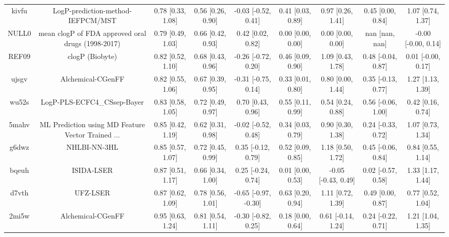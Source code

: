 \documentclass{article}
\begin{document}
\begin{center}
\begin{longtable}{|ccccccccc|}
 kivfu &                  LogP-prediction-method-IEFPCM/MST &  0.78 [0.33, 1.08] &  0.56 [0.26, 0.90] &   -0.03 [-0.52, 0.41] &  0.41 [0.03, 0.89] &    0.97 [0.26, 1.41] &    0.45 [0.00, 0.84] &     1.07 [0.74, 1.37] \\
 NULL0 &  mean clogP of FDA approved oral drugs (1998-2017) &  0.79 [0.49, 1.03] &  0.66 [0.42, 0.93] &     0.42 [0.02, 0.82] &  0.00 [0.00, 0.00] &    0.00 [0.00, 0.00] &       nan [nan, nan] &   -0.00 [-0.00, 0.14] \\
 REF09 &                                    clogP (Biobyte) &  0.82 [0.52, 1.10] &  0.68 [0.43, 0.96] &   -0.26 [-0.72, 0.20] &  0.46 [0.09, 0.90] &    1.09 [0.43, 1.78] &   0.48 [-0.04, 0.87] &    0.01 [-0.00, 0.17] \\
 ujsgv &                                  Alchemical-CGenFF &  0.82 [0.55, 1.06] &  0.67 [0.39, 0.95] &   -0.31 [-0.75, 0.14] &  0.33 [0.01, 0.80] &    0.80 [0.00, 1.44] &   0.35 [-0.13, 0.77] &     1.27 [1.13, 1.39] \\
 wu52s &                        LogP-PLS-ECFC4\_CSsep-Bayer &  0.83 [0.58, 1.05] &  0.72 [0.49, 0.97] &     0.70 [0.43, 0.96] &  0.55 [0.11, 0.99] &    0.54 [0.24, 0.88] &   0.56 [-0.06, 1.00] &     0.42 [0.16, 0.74] \\
 5mahv &  ML Prediction using MD Feature Vector Trained ... &  0.85 [0.42, 1.19] &  0.62 [0.31, 0.98] &   -0.02 [-0.52, 0.48] &  0.34 [0.03, 0.79] &    0.90 [0.30, 1.38] &   0.24 [-0.33, 0.72] &     1.07 [0.73, 1.34] \\
 g6dwz &                                       NHLBI-NN-3HL &  0.85 [0.57, 1.07] &  0.72 [0.45, 0.99] &    0.35 [-0.12, 0.79] &  0.52 [0.09, 0.85] &    1.18 [0.50, 1.72] &   0.45 [-0.06, 0.84] &     0.84 [0.55, 1.14] \\
 bqeuh &                                         ISIDA-LSER &  0.87 [0.51, 1.17] &  0.66 [0.34, 1.00] &    0.25 [-0.24, 0.74] &  0.01 [0.00, 0.53] &  -0.05 [-0.43, 0.49] &   0.02 [-0.57, 0.58] &     1.33 [1.17, 1.44] \\
 d7vth &                                           UFZ-LSER &  0.87 [0.62, 1.09] &  0.78 [0.56, 1.01] &  -0.65 [-0.97, -0.30] &  0.63 [0.20, 0.94] &    1.11 [0.72, 1.39] &    0.49 [0.00, 0.87] &     0.77 [0.52, 1.04] \\
 2mi5w &                                  Alchemical-CGenFF &  0.95 [0.63, 1.24] &  0.81 [0.54, 1.11] &   -0.30 [-0.82, 0.25] &  0.18 [0.00, 0.64] &   0.61 [-0.14, 1.24] &   0.24 [-0.22, 0.71] &     1.21 [1.04, 1.35] \\

\end{longtable}
\end{center}
\end{document}
